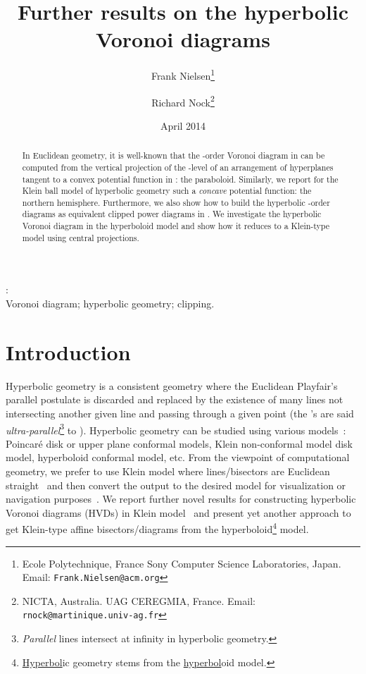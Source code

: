 \documentclass[12pt]{article}
\begin{document}
\title{Further results on the hyperbolic Voronoi diagrams}

\date{April 2014} 

\author{Frank Nielsen\thanks{Ecole Polytechnique, France 
Sony Computer Science Laboratories, Japan.
Email: {\tt Frank.Nielsen@acm.org}}
\and
Richard Nock\thanks{NICTA, Australia.
UAG CEREGMIA, France.
Email: {\tt rnock@martinique.univ-ag.fr}}
}

\maketitle


\begin{abstract}
In Euclidean geometry, it is well-known that the -order Voronoi diagram in  can be computed from the vertical projection of the -level of an arrangement of hyperplanes tangent to a convex potential function in : the paraboloid.
Similarly, we report  for the Klein ball model of hyperbolic geometry such a {\em concave} potential function: the northern hemisphere.
Furthermore, we also show how to build the hyperbolic -order diagrams as  equivalent clipped power diagrams in .
We investigate the hyperbolic Voronoi diagram in the hyperboloid model and show how it reduces to a Klein-type model using central projections.
\end{abstract}

:\\
Voronoi diagram; hyperbolic geometry; clipping.
 


 



\section{Introduction}
Hyperbolic geometry is a consistent geometry where the Euclidean Playfair's parallel postulate is discarded and replaced by the existence of many lines  not intersecting another given line   and passing through a given point  (the 's are said {\em ultra-parallel}\footnote{{\em Parallel} lines intersect at infinity in hyperbolic geometry.} to ).
Hyperbolic geometry can be studied using various models~\cite{VHVD-2014}: Poincar\'e disk or upper plane conformal models, Klein  non-conformal model disk model, hyperboloid conformal model, etc.
From the viewpoint of computational geometry, we prefer to use Klein model where lines/bisectors are Euclidean straight~\cite{HVDeasy-2010} and then convert the output to the desired model for visualization or navigation purposes~\cite{VHVD-2014}. 
We report further novel results for constructing hyperbolic Voronoi diagrams (HVDs) in Klein model~\cite{HVDeasy-2010} and present yet another approach to get Klein-type affine bisectors/diagrams from the hyperboloid\footnote{\underline{Hyperbol}ic geometry stems from the \underline{hyperbol}oid model.} model.
\end{document}
